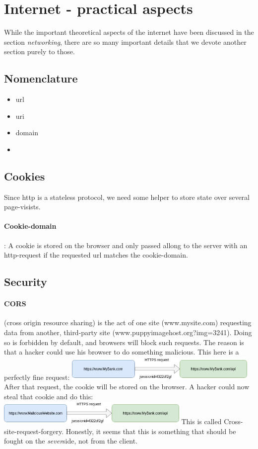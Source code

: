\section{Internet - practical aspects}

While the important theoretical aspects of the internet have been discussed in the section \emph{networking}, there are so many important details that we devote another section purely to those. 

\subsection{Nomenclature}

\begin{itemize}
	\item url
	\item uri
	\item domain
	\item 
\end{itemize}


\subsection{Cookies}

Since http is a stateless protocol, we need some helper to store state over several page-visists. 

\paragraph{Cookie-domain}: A cookie is stored on the browser and only passed allong to the server with an http-request if the requested url matches the cookie-domain. 



\subsection{Security}

\paragraph{CORS} (cross origin resource sharing) is the act of one site (www.mysite.com) requesting data from another, third-party site (www.puppyimagehost.org?img=3241). Doing so is forbidden by default, and browsers will block such requests. The reason is that a hacker could use his browser to do something malicious. This here is a perfectly fine request: 
\includegraphics[width=0.7\textwidth]{images/cookie_3.jpg}
After that request, the  cookie will be stored on the browser. A hacker could now steal that cookie and do this: 
\includegraphics[width=0.7\textwidth]{images/cookie_4.jpg}
This is called Cross-site-request-forgery. Honestly, it seems that this is something that should be fought on the \emph{sever}side, not from the client.


